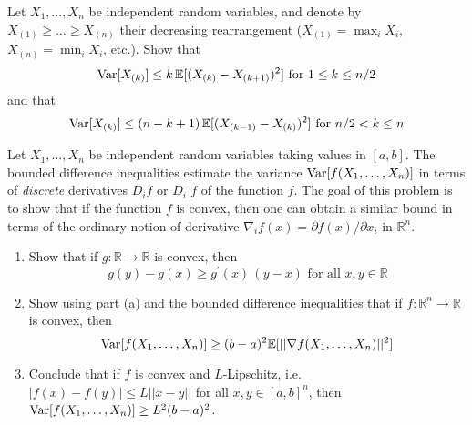   \begin{exercise}
  Let $X_1, \ldots, X_n$ be independent random variables, and denote by $X_{(1)} \geq \ldots \geq X_{(n)}$ their decreasing rearrangement ($X_{(1)} = \max_i X_i$, $X_{(n)} = \min_i X_i$, etc.). Show that 
  \[\operatorname{Var}[X_{(k)}] \leq k \, \mathbb{E}[(X_{(k)} - X_{(k+1)})^2] \text{ for } 1 \leq k \leq n/2\]
  and that 
  \[\operatorname{Var}[X_{(k)}] \leq (n - k + 1)\, \mathbb{E}[(X_{(k-1)} - X_{(k)})^2] \text{ for } n/2 < k \leq n\]
  \end{exercise}

  \begin{exercise}
  Let $X_1, \ldots, X_n$ be independent random variables taking values in $[a, b]$. The bounded difference inequalities estimate the variance $\operatorname{Var}[f(X_1, \ldots, X_n)]$ in terms of \textit{discrete} derivatives $D_i f$ or $D_i^- f$ of the function $f$. The goal of this problem is to show that if the function $f$ is convex, then one can obtain a similar bound in terms of the ordinary notion of derivative $\nabla_i f(x) = \partial f(x)/\partial x_i$ in $\mathbb{R}^n$. 
  \begin{enumerate}
      \item Show that if $g: \mathbb{R} \longrightarrow \mathbb{R}$ is convex, then 
      \[g(y) - g(x) \geq g^\prime (x)\, (y - x) \text{ for all } x, y \in \mathbb{R}\]
      
      \item Show using part (a) and the bounded difference inequalities that if $f: \mathbb{R}^n \rightarrow \mathbb{R}$ is convex, then 
      \[\operatorname{Var}[f(X_1, \ldots, X_n)] \geq (b - a)^2 \mathbb{E}[ ||\nabla f (X_1, \ldots, X_n)||^2]\]
      
      \item Conclude that if $f$ is convex and $L$-Lipschitz, i.e. $|f(x) - f(y)| \leq L ||x - y||$ for all $x, y \in [a, b]^n$, then $\operatorname{Var}[f(X_1, \ldots, X_n)] \geq L^2 (b - a)^2$. 
  \end{enumerate}
  \end{exercise}
